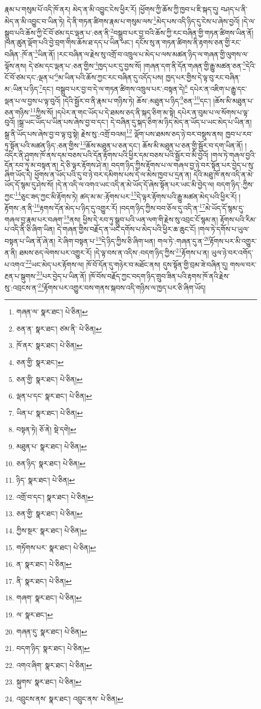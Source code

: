 རྣམ་པ་གསུམ་པོ་འདི་ཁོ་ནར། མེད་ན་མི་འབྱུང་ངེས་ཕྱིར་རོ། །ཕྱོགས་ཀྱི་ཆོས་ཀྱི་ཁྱབ་པ་ཇི་སྐད་དུ། བཤད་པ་ནི་མེད་ན་མི་འབྱུང་བ་ཡིན་ཏེ། དེ་ནི་གཏན་ཚིགས་རྣམ་པ་གསུམ་ལས་\footnote{གཞན་ལ་  སྣར་ཐང་།  པེ་ཅིན། }མེད་པས་འདི་ཉིད་དུ་ངེས་པ་ཞེས་བྱའོ། །དེ་ལ་སྒྲུབ་པའི་ཆོས་ཀྱི་ངོ་བོ་ཙམ་དང་ལྡན་པ་:ཅན་ནི་\footnote{ཅན་ན་  སྣར་ཐང་། ཙམ་ནི་  པེ་ཅིན། }བསྒྲུབ་པར་བྱ་བའི་ཆོས་ཀྱི་རང་བཞིན་གྱི་གཏན་ཚིགས་ཡིན་ནོ། །ཕན་ཚུན་ལྡོག་པའི་བྱེ་བྲག་གིས་ཆོས་ཐ་དད་པ་ཡིན་ཡང་། དངོས་སུ་ན་གཏན་ཚིགས་ནི་རྟགས་ཅན་གྱི་རང་བཞིན་:ཁོ་ན་\footnote{ཁོ་ནར་  སྣར་ཐང་།  པེ་ཅིན། }ཡིན་ནོ། །རང་བཞིན་ལ་རྗེས་སུ་འགྲོ་བ་འཁྲུལ་པ་མེད་པ་ལས་མཚན་ཉིད་ལ་གཞན་གྱི་ལུགས་ལ་ལྟོས་ནས། དེ་ཙམ་དང་ལྡན་པ་:ཅན་གྱིས་\footnote{ཅན་གྱི་  སྣར་ཐང་། }ཁྱད་པར་དུ་བྱས་སོ། །གཞན་དག་ནི་དོན་གཞན་གྱི་རྒྱུ་མཚན་ཅན་\footnote{ཅན་གྱི་  སྣར་ཐང་།  པེ་ཅིན། }དེའི་ངོ་བོ་ཙམ་དང་:ལྡན་པ་\footnote{ལྡན་པ་དང་  སྣར་ཐང་།  པེ་ཅིན། }མ་ཡིན་པའི་ཆོས་ཀྱང་རང་བཞིན་དུ་འདོད་པས། ཁྱད་པར་གྱིས་དེ་ལྟ་བུ་རང་བཞིན་མ་:ཡིན་པ་ཉིད་\footnote{ཡིན་པ་  སྣར་ཐང་།  པེ་ཅིན། }དང་། བསྒྲུབ་པར་བྱ་བ་དེ་ལ་གཏན་ཚིགས་འཁྲུལ་པར་:བསྟན་དེ།\footnote{བསྟན་ཏེ།  ཅོ་ནེ།  སྡེ་དགེ། } དཔེར་ན་འཇིག་པ་རྒྱུ་དང་ལྡན་པ་ལ་བྱས་པ་ལྟ་བུའོ། །དེའི་སྦྱོར་བ་ནི་རྣམ་པ་གཉིས་ཏེ། ཆོས་:མཐུན་པ་ཉིད་\footnote{མཐུན་པ་  སྣར་ཐང་།  པེ་ཅིན། }ཅན་\footnote{ཅན་ཉིད་  སྣར་ཐང་།  པེ་ཅིན། }དང་། །ཆོས་མི་མཐུན་པ་ཅན་གཉིས་\footnote{ཉིད་  སྣར་ཐང་།  པེ་ཅིན། }ཀྱིས་སོ། །དཔེར་ན་གང་ཡོད་པ་དེ་ཐམས་ཅད་ནི་སྐད་ཅིག་མ་སྟེ། དཔེར་ན་བུམ་པ་ལ་སོགས་པ་ལྟ་བུའོ། །སྒྲ་ཡང་ཡོད་པ་ཡིན་པས་ཞེས་བྱ་བ་དང་། དེ་བཞིན་དུ་སྐད་ཅིག་མ་ཉིད་མེད་ན་ཡོད་པ་ཡང་མེད་པ་ཡིན་ན། སྒྲ་ནི་ཡོད་པས་ཞེས་བྱ་བ་ལྟ་བུ་སྟེ། རྗེས་སུ་:འགྲོ་བའམ།\footnote{འགྲོ་བ་དང་།  སྣར་ཐང་།  པེ་ཅིན། } ལྡོག་པས་ཐམས་ཅད་ཉེ་བར་བསྡུས་ནས། ཁྱབ་པ་རབ་ཏུ་སྟོན་པའི་མཚན་ཉིད་:ཅན་གྱིས་\footnote{ཅན་གྱི་  སྣར་ཐང་།  པེ་ཅིན། }ཆོས་མཐུན་པ་ཅན་དང་། ཆོས་མི་མཐུན་པ་ཅན་གྱི་སྦྱོར་བ་དག་ཡིན་ནོ། །འདིར་ནི་ཤུགས་ཁོ་ནས་དམ་བཅས་པའི་དོན་རྟོགས་པའི་ཕྱིར་དམ་བཅས་པའི་སྦྱོར་བ་མི་བྱའོ། །གལ་ཏེ་གཞལ་བྱའི་དོན་རབ་ཏུ་མ་བསྟན་ན། དེ་ཅི་ལྟར་རྟོགས་ཤེ་ན། བདག་ཉིད་ཀྱིས་རྟོགས་པ་ལ་གཞལ་བྱ་ཉེ་བར་སྟོན་པར་བྱེད་པ་སུ་ཞིག་ཡོད་དེ། ཕྱོགས་ན་ཡོད་པའི་དུ་བ་ཉེ་བར་དམིགས་པས་དེ་ལ་མེས་ཁྱབ་པ་དྲན་ན། དེའི་མཐུ་ཁོ་ནས་འདི་ན་མེ་ཡོད་དོ་སྙམ་དུ་ཤེས་སོ། །དེ་ན་འདི་ལ་འགའ་ཡང་འདི་ན་མེ་ཡོད་དོ་ཞེས་སྟོན་པར་ཡང་མི་བྱེད་ལ། བདག་ཉིད་:ཀྱིས་ཀྱང་\footnote{ཀྱིས་སྔར་  སྣར་ཐང་།  པེ་ཅིན། }ཅུང་ཟད་ཀྱང་མི་རྟོགས་ཏེ། ཚད་མ་མ་:རྟོགས་པར་\footnote{གཏོགས་པར་  སྣར་ཐང་།  པེ་ཅིན། }དེ་ལྟར་རྟོགས་པའི་རྒྱུ་མཚན་མེད་པའི་ཕྱིར་རོ། །རྟོགས་:ན་ནི་\footnote{ན་  སྣར་ཐང་།  པེ་ཅིན། }རྟགས་དོན་མེད་པ་ཉིད་དུ་འགྱུར་རོ། །བདག་ཉིད་ཀྱིས་བབ་ཅོལ་དུ་འདི་ན་\footnote{ནི་  སྣར་ཐང་།  པེ་ཅིན། }མེ་ཡོད་དོ་སྙམ་དུ་གཞལ་བྱ་རྣམ་པར་བཞག་\footnote{གཞག་  སྣར་ཐང་།  པེ་ཅིན། }ནས། ཕྱིས་དེ་རབ་ཏུ་སྒྲུབ་པའི་ཡན་ལག་གི་རྗེས་སུ་འབྲང་ངོ་སྙམ་ན། རྟོགས་པའི་རིམ་པ་འདི་ནི་ཅི་ཞིག་ཡིན། དེ་གཞན་གྱིས་བརྗོད་ན་ཡང་དགོས་པ་མེད་པའི་ཕྱིར་ཆ་ཆུང་ངོ། །གལ་ཏེ་དགོས་པ་ཡུལ་བསྟན་པ་ཡིན་ནོ་ཞེ་ན། རེ་ཞིག་བསྟན་པ་\footnote{ལ་  སྣར་ཐང་། }དེ་ཉིད་ཀྱིས་ཅི་ཞིག་ཕན། གལ་ཏེ་:གཞན་དུ་ན་\footnote{གཞན་དུ་  སྣར་ཐང་།  པེ་ཅིན། }རྟོགས་པར་མི་འགྱུར་ན་ནི། ཐམས་ཅད་ལེགས་པར་འགྱུར་རོ། །དེ་ལྟ་བས་ན་འདིས་:བདག་ཉིད་ཀྱིས་\footnote{བདག་ཉིད་  སྣར་ཐང་།  པེ་ཅིན། }རྟོགས་པ་ན། ཡུལ་ཉེ་བར་འགོད་པ་འགའ་\footnote{འགའ་ཞིག་  སྣར་ཐང་།  པེ་ཅིན། }ཡང་མེད་པར་རྟོགས་ལ། ཁོ་བོ་དོན་དུ་གཉེར་བ་མཐོང་ནས། དུས་སྟོན་གྱི་བྲམ་ཟེ་བཞིན་དུ། གསལ་བར་རྔན་པ་སྒུགས་\footnote{སྐུགས་  སྣར་ཐང་།  པེ་ཅིན། }པར་བྱེད་པ་ཡིན་ནོ། །ཁོ་བོས་བརྗོད་ཀྱང་བདག་ཉིད་གྲུབ་ཟིན་པའི་རྟགས་ཁོ་ནའི་རྗེས་སུ་:འབྲངས་ན་\footnote{འབྲུངས་ནས་  སྣར་ཐང་། འབྲུང་ནས་  པེ་ཅིན། }རྟོགས་པར་འགྱུར་བས་གནས་སྐབས་འདི་གཉིས་ལ་ཁྱད་པར་ཅི་ཞིག་ཡོད། 